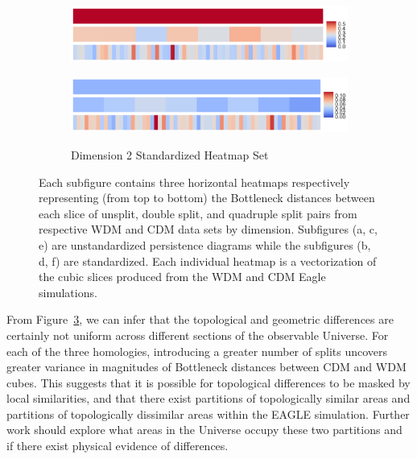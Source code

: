 \documentclass[12pt]{article}
\newcommand{\figref}[1]{Figure~\ref{#1}}
\begin{document}
\begin{figure}[htp!]
\begin{subfigure}{.45\textwidth}
    \includegraphics[width=\linewidth]{fig_12_hmap_dim2_nonorm.pdf}
    \label{fig:cubeHeatmap2}
  \end{subfigure}
  \begin{subfigure}{.45\textwidth}
    \centering
    \caption{Dimension 2 Standardized Heatmap Set}
    \includegraphics[width=\linewidth]{fig_12_hmap_dim2_yesnorm.pdf}
    \label{fig:cubeHeatmapStand2}
  \end{subfigure}
  \caption{Each subfigure contains three horizontal heatmaps respectively representing (from top to bottom) the Bottleneck distances between each slice of unsplit, double split, and quadruple split pairs from respective WDM and CDM data sets by dimension. Subfigures (a, c, e) are unstandardized persistence diagrams while the subfigures (b, d, f) are standardized. Each individual heatmap is a vectorization of the cubic slices produced from the WDM and CDM Eagle simulations.}
  \label{fig:cubeHeatmap}
\end{figure}

From \figref{fig:cubeHeatmap}, we can infer that the topological and geometric differences are certainly not uniform across different sections of the observable Universe. For each of the three homologies, introducing a greater number of splits uncovers greater variance in magnitudes of Bottleneck distances between CDM and WDM cubes. This suggests that it is possible for topological differences to be masked by local similarities, and that there exist partitions of topologically similar areas and partitions of topologically dissimilar areas within the EAGLE simulation. Further work should explore what areas in the Universe occupy these two partitions and if there exist physical evidence of differences. 
\end{document}
